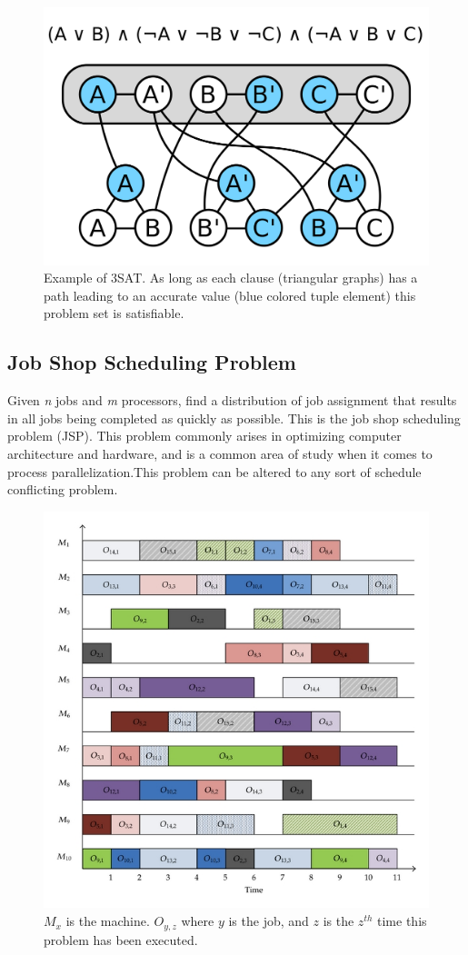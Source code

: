 \documentclass[10pt,twoside]{IEEEtran}
\begin{document}
\begin{figure}[h]
	\centering
	\includegraphics[width=0.7\linewidth]{diagrams/3sat.png}
	\caption{Example of 3SAT. As long as each clause (triangular graphs) has a path leading to an accurate value (blue colored tuple element) this problem set is satisfiable.}
	\label{3SAT fig}
\end{figure}

\subsection{Job Shop Scheduling Problem}
Given \emph{n} jobs and \emph{m} processors, find a distribution of job assignment that results in all jobs being completed as quickly as possible. This is the job shop scheduling problem (JSP). This problem commonly arises in optimizing computer architecture and hardware, and is a common area of study when it comes to process parallelization.This problem can be altered to any sort of schedule conflicting problem.

\begin{figure}[h]
	\centering
	\includegraphics[width=0.7\linewidth]{diagrams/jsp.jpg}
	\caption{$M_{x}$ is the machine. $O_{y,z}$ where $y$ is the job, and $z$ is the $z^{th}$ time this problem has been executed.}
	\label{JSS Fig}
\end{figure}
\end{document}
